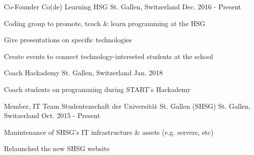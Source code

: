 

\begin{cventries}

  \cventry
    {Co-Founder} %
    {Co(de) Learning HSG} %
    {St. Gallen, Switzerland} %
    {Dec. 2016 - Present} %
    {} %
    {
      \begin{cvitems} %
        \item {Coding group to promote, teach \& learn programming at the HSG}
        \item {Give presentations on specific technologies}
        \item {Create events to connect technology-interested students at the school}
      \end{cvitems}
    }

    \cventry
      {Coach} %
      {Hackademy} %
      {St. Gallen, Switzerland} %
      {Jan. 2018} %
      {} %
      {
        \begin{cvitems} %
          \item {Coach students on programming during START's Hackademy}
        \end{cvitems}
      }

  \cventry
    {Member, IT Team} %
    {Studentenschaft der Universität St. Gallen (SHSG)} %
    {St. Gallen, Switzerland} %
    {Oct. 2015 - Present} %
    {} %
    {
      \begin{cvitems} %
        \item {Manintenance of SHSG's IT infrastructure \& assets (e.g. servers, etc)}
        \item {Relaunched the new SHSG website}
      \end{cvitems}
    }


\end{cventries}

